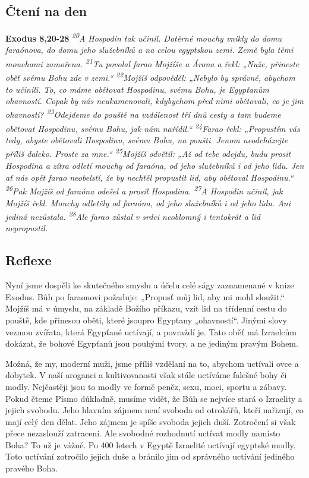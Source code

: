 \documentclass[11pt]{article}
\begin{document}
\subsection*{Čtení na den}
\textbf{Exodus 8,20-28}
\newline
\textit{
\textsuperscript{20}A Hospodin tak učinil. Dotěrné mouchy vnikly do domu faraónova, do domu jeho služebníků a na celou egyptskou zemi. Země byla těmi mouchami zamořena.
\textsuperscript{21}Tu povolal farao Mojžíše a Árona a řekl: „Nuže, přineste oběť svému Bohu zde v zemi.“
\textsuperscript{22}Mojžíš odpověděl: „Nebylo by správné, abychom to učinili. To, co máme obětovat Hospodinu, svému Bohu, je Egypťanům ohavností. Copak by nás neukamenovali, kdybychom před nimi obětovali, co je jim ohavností?
\textsuperscript{23}Odejdeme do pouště na vzdálenost tří dnů cesty a tam budeme obětovat Hospodinu, svému Bohu, jak nám nařídil.“
\textsuperscript{24}Farao řekl: „Propustím vás tedy, abyste obětovali Hospodinu, svému Bohu, na poušti. Jenom neodcházejte příliš daleko. Proste za mne.“
\textsuperscript{25}Mojžíš odvětil: „Až od tebe odejdu, budu prosit Hospodina a zítra odletí mouchy od faraóna, od jeho služebníků i od jeho lidu. Jen ať nás opět farao neobelstí, že by nechtěl propustit lid, aby obětoval Hospodinu.“
\textsuperscript{26}Pak Mojžíš od faraóna odešel a prosil Hospodina.
\textsuperscript{27}A Hospodin učinil, jak Mojžíš řekl. Mouchy odletěly od faraóna, od jeho služebníků i od jeho lidu. Ani jediná nezůstala.
\textsuperscript{28}Ale farao zůstal v srdci neoblomný i tentokrát a lid nepropustil.
}

\subsection*{Reflexe}
Nyní jsme dospěli ke skutečného smyslu a účelu celé ságy zaznamenané v knize Exodus. Bůh po
faraonovi požaduje: „Propusť můj lid, aby mi mohl sloužit.“ Mojžíš má v úmyslu, na základě Božího
příkazu, vzít lid na třídenní cestu do pouště, kde přinesou oběti, které jsoupro Egypťany „ohavností“.
Jinými slovy vezmou zvířata, která Egypťané uctívají, a povraždí je. Tato oběť má Izraelcům dokázat, že
bohové Egypťanů jsou pouhými tvory, a ne jediným pravým Bohem.

Možná, že my, moderní muži, jsme příliš vzdělaní na to, abychom uctívali ovce a dobytek. V naší
aroganci a kultivovanosti však stále uctíváme falešné bohy či modly. Nejčastěji jsou to modly ve formě
peněz, sexu, moci, sportu a zábavy. Pokud čteme Písmo důkladně, musíme vidět, že Bůh se nejvíce stará
o Izraelity a jejich svobodu. Jeho hlavním zájmem není svoboda od otrokářů, kteří nařizují, co mají celý
den dělat. Jeho zájmem je spíše svoboda jejich duší. Zotročení si však přece nezaslouží zatracení. Ale
svobodné rozhodnutí uctívat modly namísto Boha? To už je vážné. Po 400 letech v Egyptě Izraelité
uctívají egyptské modly. Toto uctívání zotročilo jejich duše a bránilo jim od správného uctívání jediného
pravého Boha.
\end{document}
